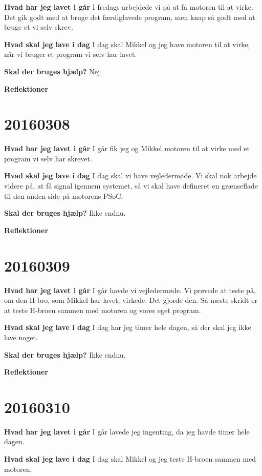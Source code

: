 \documentclass{article}
\begin{document}
	\textbf{Hvad har jeg lavet i går}
	I fredags arbejdede vi på at få motoren til at virke. Det gik godt med at bruge det færdiglavede program, men knap så godt med at bruge et vi selv skrev. 
	
	\textbf{Hvad skal jeg lave i dag}
	I dag skal Mikkel og jeg have motoren til at virke, når vi bruger et program vi selv har lavet. 
	
	\textbf{Skal der bruges hjælp?}
	Nej. 
	
	\textbf{Reflektioner}
	
	\section{20160308}
	
	\textbf{Hvad har jeg lavet i går}
	I går fik jeg og Mikkel motoren til at virke med et program vi selv har skrevet. 
	
	\textbf{Hvad skal jeg lave i dag}
	I dag skal vi have vejledermøde. Vi skal nok arbejde videre på, at få signal igennem systemet, så vi skal have defineret en grænseflade til den anden side på motorens PSoC. 
	
	\textbf{Skal der bruges hjælp?}
	Ikke endnu. 
	
	\textbf{Reflektioner}

	\section{20160309}
	
	\textbf{Hvad har jeg lavet i går}
	I går havde vi vejledermøde. Vi prøvede at teste på, om den H-bro, som Mikkel har lavet, virkede. Det gjorde den. Så næste skridt er at teste H-broen sammen med motoren og vores eget program.  
	
	\textbf{Hvad skal jeg lave i dag}
	I dag har jeg timer hele dagen, så der skal jeg ikke lave noget. 
	
	\textbf{Skal der bruges hjælp?}
	Ikke endnu. 
	
	\textbf{Reflektioner}	
	
	\section{20160310}
	
	\textbf{Hvad har jeg lavet i går}
	I går lavede jeg ingenting, da jeg havde timer hele dagen.  
	
	\textbf{Hvad skal jeg lave i dag}
	I dag skal Mikkel og jeg teste H-broen sammen med motoren. 
	
\end{document}
